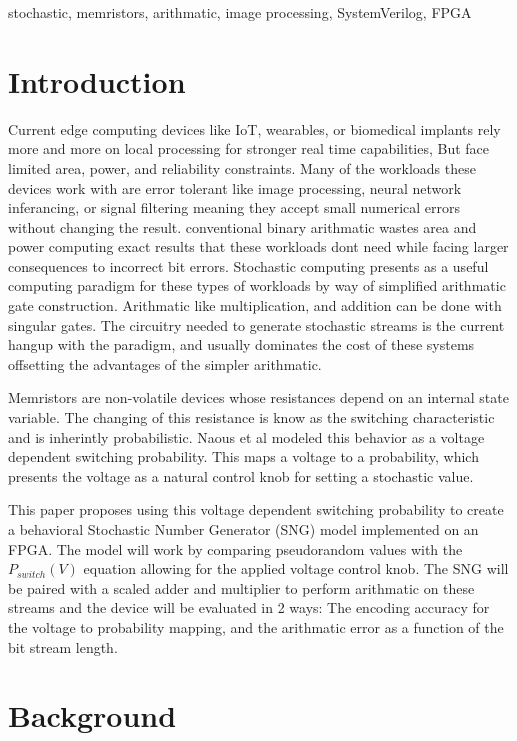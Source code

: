 \documentclass[conference]{IEEEtran}
\begin{document}
\begin{IEEEkeywords}
stochastic, memristors, arithmatic, image processing, SystemVerilog, FPGA
\end{IEEEkeywords}

\section{Introduction}
Current edge computing devices like IoT, wearables, or biomedical implants rely
more and more on local processing for stronger real time capabilities, But face
limited area, power, and reliability constraints. Many of the workloads these devices work
with are error tolerant like image processing, neural network inferancing, or 
signal filtering meaning they accept small numerical errors without changing the result.
conventional binary arithmatic wastes area and power computing exact results that 
these workloads dont need while facing larger consequences to incorrect bit errors.
Stochastic computing presents as a useful computing paradigm for these types of workloads
by way of simplified arithmatic gate construction. Arithmatic like multiplication, and
addition can be done with singular gates. The circuitry needed to generate stochastic
streams is the current hangup with the paradigm, and usually dominates the cost of these
systems offsetting the advantages of the simpler arithmatic.

Memristors are non-volatile devices whose resistances depend on an internal state variable.
The changing of this resistance is know as the switching characteristic and is
inherintly probabilistic. Naous et al \cite{memristor_stochasticity} modeled this
behavior as a voltage dependent switching probability. This maps a voltage to a 
probability, which presents the voltage as a natural control knob for setting a 
stochastic value.

This paper proposes using this voltage dependent switching probability to create a
behavioral Stochastic Number Generator (SNG) model implemented on an FPGA. 
The model will work by comparing pseudorandom
values with the $P_{switch}(V)$ equation allowing for the applied voltage control knob.
The SNG will be paired with a scaled adder and multiplier to perform arithmatic on
these streams and the device will be evaluated in 2 ways: The encoding accuracy for the
voltage to probability mapping, and the arithmatic error as a function of the bit
stream length.

\section{Background}
\end{document}

